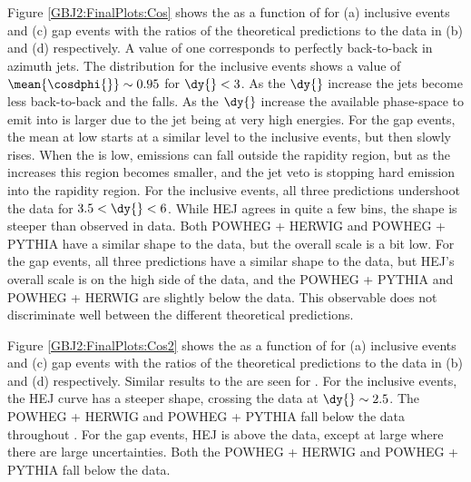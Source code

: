 
Figure \ref{GBJ2:FinalPlots:Cos} shows the \mean{\cosdphi{}} as a function of \dy{} for (a) inclusive events and (c) gap events with the ratios of the theoretical predictions to the data in (b) and (d) respectively. 
A \mean{\cosdphi{}} value of one corresponds to perfectly back-to-back in azimuth jets.
The \mean{\cosdphi{}} distribution for the inclusive events shows a value of $ \mean{\cosdphi{}}\sim0.95$ for $\dy{}<3$.
As the $\dy{}$ increase the jets become less back-to-back and the \mean{\cosdphi{}} falls.
As the $\dy{}$ increase the available phase-space to emit into is larger due to the jet being at very high energies.
For the gap events, the mean{\cosdphi{}} at low \dy{} starts at a similar level to the inclusive events, but then slowly rises.
When the \dy{} is low, emissions can fall outside the rapidity region, but as the \dy{} increases this region becomes smaller, and the jet veto is stopping hard emission into the rapidity region.
For the inclusive events, all three predictions undershoot the data for $3.5<\dy{}<6$.
While HEJ agrees in quite a few bins, the shape is steeper than observed in data.
Both POWHEG + HERWIG and POWHEG + PYTHIA have a similar shape to the data, but the overall scale is a bit low.
For the gap events, all three predictions have a similar shape to the data, but HEJ's overall scale is on the high side of the data, and the POWHEG + PYTHIA and  POWHEG + HERWIG are slightly below the data.
This observable does not discriminate well between the different theoretical predictions. 

Figure \ref{GBJ2:FinalPlots:Cos2} shows the \mean{\costwodphi{}} as a function of \dy{} for (a) inclusive events and (c) gap events with the ratios of the theoretical predictions to the data in (b) and (d) respectively. 
Similar results to the \mean{\cosdphi{}} are seen for \mean{\costwodphi{}}.
For the inclusive events, the HEJ curve has a steeper shape, crossing the data at $\dy{}\sim2.5$. 
The POWHEG + HERWIG and POWHEG + PYTHIA fall below the data throughout \dy{}.
For the gap events, HEJ is above the data, except at large \dy{} where there are large uncertainties.
Both the POWHEG + HERWIG and POWHEG + PYTHIA fall below the data.

